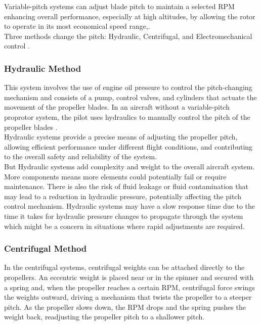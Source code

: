 Variable-pitch systems can adjust blade pitch to maintain a selected \gls{RPM} enhancing overall performance, especially at high altitudes, by allowing the rotor to operate in its most economical speed range\cite{VPP2},\cite{VPP3}.\\

Three methods change the pitch: Hydraulic, Centrifugal, and Electromechanical control \cite{VPP2}.\\
\subsubsection{Hydraulic Method}
This system involves the use of engine oil pressure to control the pitch-changing mechanism and consists of a pump, control valves, and cylinders that actuate the movement of the propeller blades.
In an aircraft without a variable-pitch proprotor system, the pilot uses hydraulics to manually control the pitch of the propeller blades \cite{VPP2}.\\

Hydraulic systems provide a precise means of adjusting the propeller pitch, allowing efficient performance under different flight conditions, and contributing to the overall safety and reliability of the system.\\

But Hydraulic systems add complexity and weight to the overall aircraft system. 
More components means more elements could potentially fail or require maintenance. 
There is also the risk of fluid leakage or fluid contamination that may lead to a reduction in hydraulic pressure, potentially affecting the pitch control mechanism.
Hydraulic systems may have a slow response time due to the time it takes for hydraulic pressure changes to propagate through the system which might be a concern in situations where rapid adjustments are required.\cite{VPP2}

\subsubsection{Centrifugal Method}
In the centrifugal systems, centrifugal weights can be attached directly to the propellers.
An eccentric weight is placed near or in the spinner and secured with a spring and, when the propeller reaches a certain \gls{RPM}, centrifugal force swings the weights outward, driving a mechanism that twists the propeller to a steeper pitch. 
As the propeller slows down, the \gls{RPM} drops and the spring pushes the weight back, readjusting the propeller pitch to a shallower pitch.

